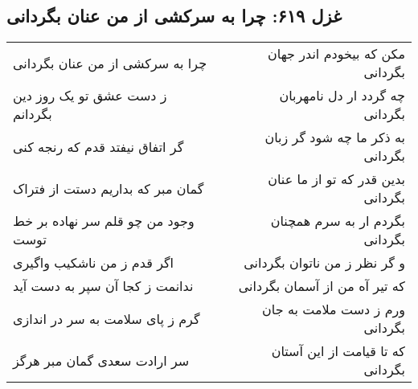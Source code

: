 \begin{center}
\section*{غزل ۶۱۹: چرا به سرکشی از من عنان بگردانی}
\label{sec:619}
\begin{longtable}{l p{0.5cm} r}
چرا به سرکشی از من عنان بگردانی
&&
مکن که بیخودم اندر جهان بگردانی
\\
ز دست عشق تو یک روز دین بگردانم
&&
چه گردد ار دل نامهربان بگردانی
\\
گر اتفاق نیفتد قدم که رنجه کنی
&&
به ذکر ما چه شود گر زبان بگردانی
\\
گمان مبر که بداریم دستت از فتراک
&&
بدین قدر که تو از ما عنان بگردانی
\\
وجود من چو قلم سر نهاده بر خط توست
&&
بگردم ار به سرم همچنان بگردانی
\\
اگر قدم ز من ناشکیب واگیری
&&
و گر نظر ز من ناتوان بگردانی
\\
ندانمت ز کجا آن سپر به دست آید
&&
که تیر آه من از آسمان بگردانی
\\
گرم ز پای سلامت به سر در اندازی
&&
ورم ز دست ملامت به جان بگردانی
\\
سر ارادت سعدی گمان مبر هرگز
&&
که تا قیامت از این آستان بگردانی
\\
\end{longtable}
\end{center}
